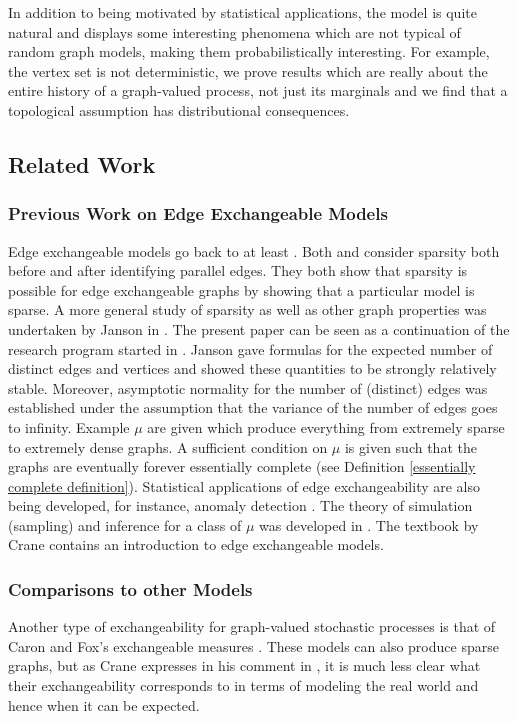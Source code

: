 \documentclass[12pt]{article}
\theoremstyle{definition}
\begin{document}
In addition to being motivated by statistical applications, the model is quite natural and displays some interesting phenomena which are not typical of random graph models, making them probabilistically interesting. For example, the vertex set is not deterministic, we prove results which are really about the entire history of a graph-valued process, not just its marginals and we find that a topological assumption has distributional consequences.

\subsection{Related Work} \label{Related work}

\subsubsection{Previous Work on Edge Exchangeable Models} Edge exchangeable models go back to at least \cite{crane_2018_edge,cai_2016_edgeexchangeable}. Both \cite{crane_2018_edge} and \cite{cai_2016_edgeexchangeable} consider sparsity both before and after identifying parallel edges. They both show that sparsity is possible for edge exchangeable graphs by showing that a particular model is sparse. A more general study of sparsity as well as other graph properties was undertaken by Janson in \cite{janson_2017_on}. The present paper can be seen as a continuation of the research program started in \cite{janson_2017_on}. Janson gave formulas for the expected number of distinct edges and vertices and showed these quantities to be strongly relatively stable. Moreover, asymptotic normality for the number of (distinct) edges was established under the assumption that the variance of the number of edges goes to infinity. Example $\mu$ are given which produce everything from extremely sparse to extremely dense graphs. A sufficient condition on $\mu$ is given such that the graphs are eventually forever essentially complete (see Definition \ref{essentially complete definition}). Statistical applications of edge exchangeability are also being developed, for instance, anomaly detection \cite{luo_2023_anomalous}. The theory of simulation (sampling) and inference for a class of $\mu$ was developed in \cite{li_2021_truncated}. The textbook by Crane \cite{crane_2018_probabilistic} contains an introduction to edge exchangeable models.

\subsubsection{Comparisons to other Models} \label{Comparisons to other Models}
Another type of exchangeability for graph-valued stochastic processes is that of Caron and Fox's exchangeable measures \cite{caron_2017_sparse}. These models can also produce sparse graphs, but as Crane expresses in his comment in \cite{caron_2017_sparse}, it is much less clear what their exchangeability corresponds to in terms of modeling the real world and hence when it can be expected.
\end{document}
